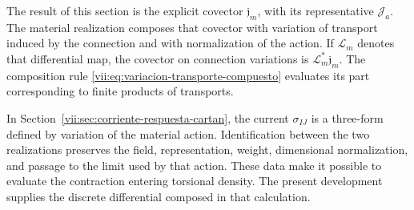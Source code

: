 The result of this section is the explicit covector
\(\mathfrak j_m\), with its representative \(\mathcal J_a\).
The material realization composes that covector with variation of
transport induced by the connection and with normalization of the action.
If \(\mathcal L_m\) denotes that differential map, the covector on
connection variations is \(\mathcal L_m^*\mathfrak j_m\).
The composition rule
\eqref{vii:eq:variacion-transporte-compuesto} evaluates its part
corresponding to finite products of transports.

In Section~\ref{vii:sec:corriente-respuesta-cartan}, the current
\(\sigma_{IJ}\) is a three-form defined by variation of the material
action. Identification between the two realizations preserves the field,
representation, weight, dimensional normalization, and passage to the
limit used by that action. These data make it possible to evaluate the
contraction entering torsional density. The present development
supplies the discrete differential composed in that calculation.
